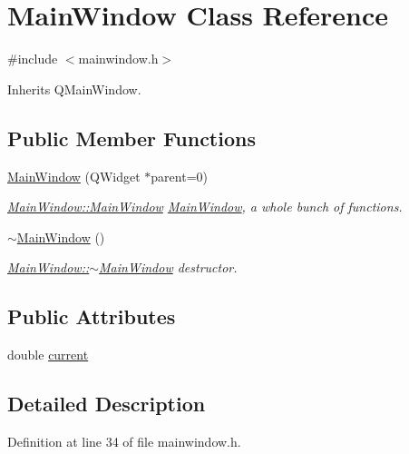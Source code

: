 \hypertarget{class_main_window}{\section{Main\-Window Class Reference}
\label{class_main_window}
}


{\ttfamily \#include $<$mainwindow.\-h$>$}



Inherits Q\-Main\-Window.

\subsection*{Public Member Functions}
\begin{DoxyCompactItemize}
\item 
\hyperlink{class_main_window_a8b244be8b7b7db1b08de2a2acb9409db}{Main\-Window} (Q\-Widget $\ast$parent=0)
\begin{DoxyCompactList}\small\item\em \hyperlink{class_main_window_a8b244be8b7b7db1b08de2a2acb9409db}{Main\-Window\-::\-Main\-Window} \hyperlink{class_main_window}{Main\-Window}, a whole bunch of functions. \end{DoxyCompactList}\item 
\hyperlink{class_main_window_ae98d00a93bc118200eeef9f9bba1dba7}{$\sim$\-Main\-Window} ()
\begin{DoxyCompactList}\small\item\em \hyperlink{class_main_window_ae98d00a93bc118200eeef9f9bba1dba7}{Main\-Window\-::$\sim$\-Main\-Window} destructor. \end{DoxyCompactList}\end{DoxyCompactItemize}
\subsection*{Public Attributes}
\begin{DoxyCompactItemize}
\item 
double \hyperlink{class_main_window_a2fbe68e548eeead0099e689f289c57f8}{current}
\end{DoxyCompactItemize}


\subsection{Detailed Description}


Definition at line 34 of file mainwindow.\-h.



